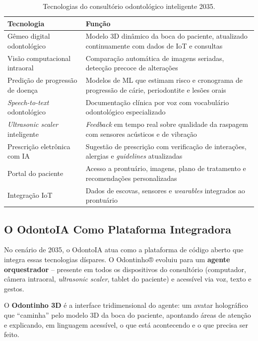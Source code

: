 \begin{table}[H]
  \centering
  \caption{Tecnologias do consultório odontológico inteligente 2035.}
  \label{tab:consultorio-2035}
  \begin{tabularx}{\textwidth}{lX}
    \toprule
    \textbf{Tecnologia} & \textbf{Função} \\
    \midrule
    Gêmeo digital odontológico & Modelo 3D dinâmico da boca do paciente,
      atualizado continuamente com dados de IoT e consultas \\
    Visão computacional intraoral & Comparação automática de imagens seriadas,
      detecção precoce de alterações \\
    Predição de progressão de doença & Modelos de ML que estimam risco e
      cronograma de progressão de cárie, periodontite e lesões orais \\
    \textit{Speech-to-text} odontológico & Documentação clínica por voz com
      vocabulário odontológico especializado \\
    \textit{Ultrasonic scaler} inteligente & \textit{Feedback} em tempo real
      sobre qualidade da raspagem com sensores acústicos e de vibração \\
    Prescrição eletrônica com IA & Sugestão de prescrição com verificação de
      interações, alergias e \textit{guidelines} atualizadas \\
    Portal do paciente & Acesso a prontuário, imagens, plano de tratamento e
      recomendações personalizadas \\
    Integração IoT & Dados de escovas, sensores e \textit{wearables} integrados
      ao prontuário \\
    \bottomrule
  \end{tabularx}
\end{table}

\subsection{O OdontoIA Como Plataforma Integradora}

No cenário de 2035, o OdontoIA atua como a plataforma de código aberto que
integra essas tecnologias díspares. O Odontinho® evoluiu para um \textbf{agente
orquestrador} -- presente em todos os dispositivos do consultório (computador,
câmera intraoral, \textit{ultrasonic scaler}, tablet do paciente) e acessível
via voz, texto e gestos.

O \textbf{Odontinho 3D} é a interface tridimensional do agente: um avatar
holográfico que ``caminha'' pelo modelo 3D da boca do paciente, apontando áreas
de atenção e explicando, em linguagem acessível, o que está acontecendo e o que
precisa ser feito.

